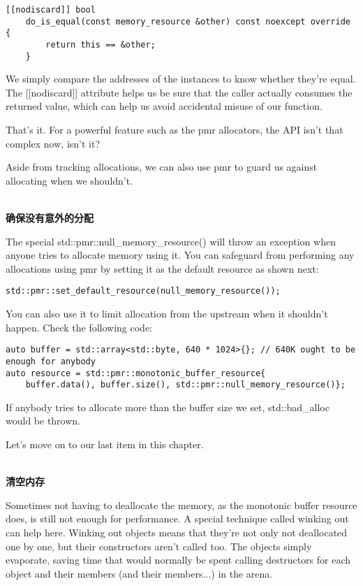 \begin{lstlisting}[style=styleCXX]
	[[nodiscard]] bool
	do_is_equal(const memory_resource &other) const noexcept override {
		return this == &other;
	}
\end{lstlisting}

We simply compare the addresses of the instances to know whether they're equal. The [[nodiscard]] attribute helps us be sure that the caller actually consumes the returned value, which can help us avoid accidental misuse of our function.

That's it. For a powerful feature such as the pmr allocators, the API isn't that complex now, isn't it?

Aside from tracking allocations, we can also use pmr to guard us against allocating when we shouldn't.

\hspace*{\fill} \\ %
\noindent
\textbf{确保没有意外的分配}

The special std::pmr::null\_memory\_resource() will throw an exception when anyone tries to allocate memory using it. You can safeguard from performing any allocations using pmr by setting it as the default resource as shown next:

\begin{lstlisting}[style=styleCXX]
std::pmr::set_default_resource(null_memory_resource());
\end{lstlisting}

You can also use it to limit allocation from the upstream when it shouldn't happen. Check the following code:

\begin{lstlisting}[style=styleCXX]
auto buffer = std::array<std::byte, 640 * 1024>{}; // 640K ought to be
enough for anybody
auto resource = std::pmr::monotonic_buffer_resource{
	buffer.data(), buffer.size(), std::pmr::null_memory_resource()};
\end{lstlisting}

If anybody tries to allocate more than the buffer size we set, std::bad\_alloc would be thrown.

Let's move on to our last item in this chapter.

\hspace*{\fill} \\ %
\noindent
\textbf{清空内存}

Sometimes not having to deallocate the memory, as the monotonic buffer resource does, is still not enough for performance. A special technique called winking out can help here. Winking out objects means that they're not only not deallocated one by one, but their constructors aren't called too. The objects simply evaporate, saving time that would normally be spent calling destructors for each object and their members (and their members...) in the arena.

